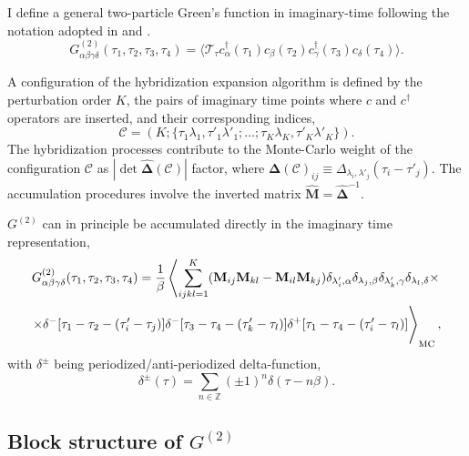 \documentclass[a4paper,12pt]{article}
\newcommand{\aver}[1]{\ensuremath{\langle#1\rangle}}
\renewcommand{\t}{\ensuremath{\tau}}
\begin{document}
I define a general two-particle Green's function in imaginary-time following the notation adopted in
\cite{Boehnke15} and \cite{RohringerThesis}.
\begin{equation}
	G^{(2)}_{\alpha\beta\gamma\delta}(\t_1,\t_2,\t_3,\t_4) =
	\aver{\mathcal{T}_\t c^\dag_\alpha(\t_1) c_\beta(\t_2) c^\dag_\gamma(\t_3) c_\delta(\t_4)}.
\end{equation}

A configuration of the hybridization expansion algorithm is defined by the
perturbation order $K$, the pairs of imaginary time points where $c$ and $c^\dag$
operators are inserted, and their corresponding indices,
\begin{equation}
\mathcal{C} = (K;\{\tau_1\lambda_1,\tau'_1\lambda'_1;\ldots;\tau_K\lambda_K,\tau'_K\lambda'_K\}).
\end{equation}
The hybridization processes contribute to the Monte-Carlo weight of the configuration
$\mathcal{C}$ as $|\det \mathbf{\hat\Delta}(\mathcal{C})|$ factor, where
$\mathbf{\Delta}(\mathcal{C})_{ij} \equiv \Delta_{\lambda_i,\lambda'_j}(\tau_i-\tau'_j)$.
The accumulation procedures involve the inverted matrix $\mathbf{\hat M} = \mathbf{\hat\Delta}^{-1}$.

$G^{(2)}$ can in principle be accumulated directly in the imaginary time representation,
\begin{multline}\label{accum_tau}
    G^{(2)}_{\alpha\beta\gamma\delta}(\t_1,\t_2,\t_3,\t_4) =
    \frac{1}{\beta}\left\langle
    \sum_{ijkl=1}^K
    (\mathbf{M}_{ij} \mathbf{M}_{kl} - \mathbf{M}_{il} \mathbf{M}_{kj})
    \delta_{\lambda'_i,\alpha} \delta_{\lambda_j,\beta}
    \delta_{\lambda'_k,\gamma} \delta_{\lambda_l,\delta}
    \times\right.\\\left.\times
    \delta^-[\t_1 - \t_2 -(\t'_i-\t_j)]\delta^-[\t_3-\t_4-(\t'_k-\t_l)]
    \delta^+[\t_1-\t_4-(\tau'_i-\tau_l)]
    \vphantom{\sum_{ijkl=1}^K} \right\rangle_\mathrm{MC},
\end{multline}
with $\delta^{\pm}$ being periodized/anti-periodized delta-function,
\begin{equation}
    \delta^{\pm}(\tau) = \sum_{n\in\mathbb{Z}}(\pm1)^n\delta(\tau-n\beta).
\end{equation}


\subsection{Block structure of $G^{(2)}$}
\end{document}
